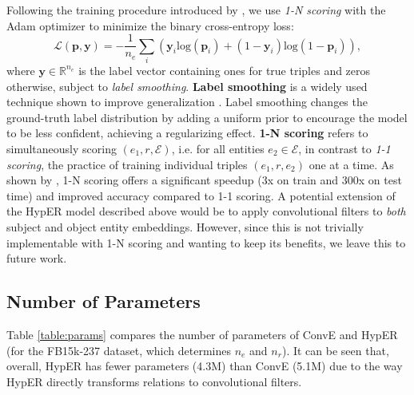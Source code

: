 \documentclass[runningheads]{llncs}
\begin{document}
Following the training procedure introduced by \cite{dettmers2017convolutional}, we use \emph{1-N scoring} with the Adam optimizer \cite{kingma2014adam} to minimize the binary cross-entropy loss:
\begin{equation}
\mathcal{L}(\mathbf{p}, \mathbf{y}) = -\frac{1}{n_e}\sum_i (\mathbf{y}_i \text{log}(\mathbf{p}_i) + (1-\mathbf{y}_i) \text{log}(1-\mathbf{p}_i)),
\end{equation}
where $\mathbf{y} \in \mathbb{R}^{n_e}$ is the label vector containing ones for true triples and zeros otherwise, subject to \emph{label smoothing}.  \textbf{Label smoothing} is a widely used technique shown to improve generalization \cite{szegedy2016rethinking,pereyra2017regularizing}. Label smoothing changes the ground-truth label distribution by adding a uniform prior to encourage the model to be less confident, achieving a regularizing effect. \textbf{1-N scoring} refers to simultaneously scoring $(e_1, r, \mathcal{E})$, i.e. for all entities $e_2 \in \mathcal{E}$, in contrast to \emph{1-1 scoring}, the practice of training individual triples $(e_1, r, e_2)$ one at a time. As shown by \cite{dettmers2017convolutional}, 1-N scoring offers a significant speedup (3x on train and 300x on test time) and improved accuracy compared to 1-1 scoring. A potential extension of the HypER model described above would be to apply convolutional filters to \emph{both} subject and object entity embeddings. However, since this is not trivially implementable with 1-N scoring and wanting to keep its benefits, we leave this to future work. 

\subsection{Number of Parameters}

Table \ref{table:params} compares the number of parameters of ConvE and HypER (for the FB15k-237 dataset, which determines $n_e$ and $n_r$). It can be seen that, overall, HypER has fewer parameters (4.3M) than ConvE (5.1M) due to the way HypER directly transforms relations to convolutional filters.
\end{document}
